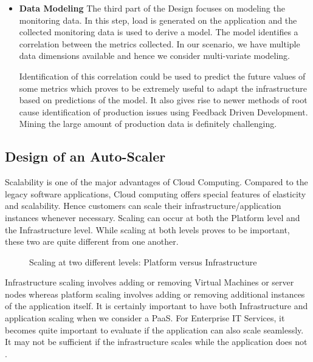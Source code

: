 \documentclass[article,type=msc,colorback,12pt,accentcolor=tud7b,table]{tudthesis}
\begin{document}
\begin{itemize}
	 	\item {\textbf{Data Modeling}} 
	 	\newline The third part of the Design focuses on modeling the monitoring data. In this step, load is generated on the application and the collected monitoring data is used to derive a model. The model identifies a correlation between the metrics collected. In our scenario, we have multiple data dimensions available and hence we consider multi-variate modeling.
	 	
	 	\par Identification of this correlation could be used to predict the future values of some metrics which proves to be extremely useful to adapt the infrastructure based on predictions of the model. It also gives rise to newer methods of root cause identification of production issues using Feedback Driven Development. Mining the large amount of production data is definitely challenging.
 	 	
 	 \end{itemize}
 	
 	\subsection{Design of an Auto-Scaler}
 	
 	Scalability is one of the major advantages of Cloud Computing. Compared to the legacy software applications, Cloud computing offers special features of elasticity and scalability. Hence customers can scale their infrastructure/application instances whenever necessary. Scaling can occur at both the Platform level and the Infrastructure level. While scaling at both levels proves to be important, these two are quite different from one another. 
 	
 	 \begin{figure}[!h]
 	 	\begin{center}
 	 		\makebox[\textwidth]{\texttt{[image: C3]}}
 	 	\end{center}
 	 	\caption{Scaling at two different levels: Platform versus Infrastructure}
 	 \end{figure}
 	
 	Infrastructure scaling involves adding or removing Virtual Machines or server nodes whereas platform scaling involves adding or removing additional instances of the application itself. It is certainly important to have both Infrastructure and application scaling when we consider a PaaS. For Enterprise IT Services, it becomes quite important to evaluate if the application can also scale seamlessly. It may not be sufficient if the infrastructure scales while the application does not \cite{app_infra_scale}. 
 	
\end{document}
